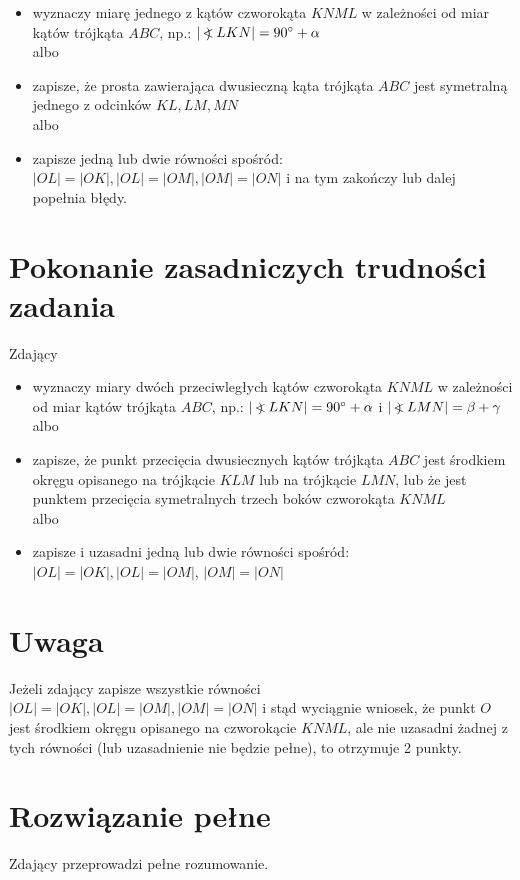 \documentclass[10pt]{article}
\newcommand\Varangle{\mathop{{<\!\!\!\!\!\text{\small)}}\:}\nolimits}
\begin{document}
\begin{itemize}
  \item wyznaczy miarę jednego z kątów czworokąta $K N M L$ w zależności od miar kątów trójkąta $A B C$, np.: $|\Varangle L K N|=90^{\circ}+\alpha$\\
albo
  \item zapisze, że prosta zawierająca dwusieczną kąta trójkąta $A B C$ jest symetralną jednego z odcinków $K L, L M, M N$\\
albo
  \item zapisze jedną lub dwie równości spośród: $|O L|=|O K|,|O L|=|O M|,|O M|=|O N|$ i na tym zakończy lub dalej popełnia błędy.
\end{itemize}

\section*{Pokonanie zasadniczych trudności zadania}
Zdający

\begin{itemize}
  \item wyznaczy miary dwóch przeciwległych kątów czworokąta $K N M L$ w zależności od miar kątów trójkąta $A B C$, np.: $|\Varangle L K N|=90^{\circ}+\alpha$ i $|\Varangle L M N|=\beta+\gamma$\\
albo
  \item zapisze, że punkt przecięcia dwusiecznych kątów trójkąta $A B C$ jest środkiem okręgu opisanego na trójkącie $K L M$ lub na trójkącie $L M N$, lub że jest punktem przecięcia symetralnych trzech boków czworokąta $K N M L$\\
albo
  \item zapisze i uzasadni jedną lub dwie równości spośród: $|O L|=|O K|,|O L|=|O M|$, $|O M|=|O N|$
\end{itemize}

\section*{Uwaga}
Jeżeli zdający zapisze wszystkie równości $|O L|=|O K|,|O L|=|O M|,|O M|=|O N|$ i stąd wyciągnie wniosek, że punkt $O$ jest środkiem okręgu opisanego na czworokącie $K N M L$, ale nie uzasadni żadnej z tych równości (lub uzasadnienie nie będzie pełne), to otrzymuje 2 punkty.

\section*{Rozwiązanie pełne}
Zdający przeprowadzi pełne rozumowanie.
\end{document}

